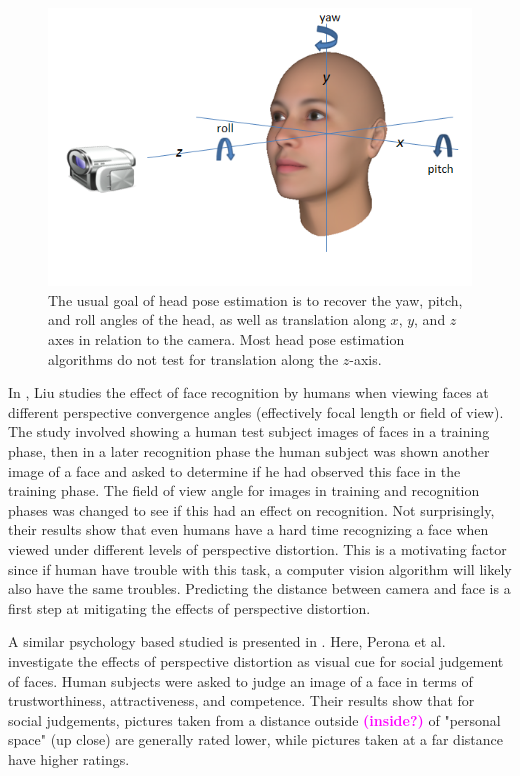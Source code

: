 \documentclass[runningheads]{llncs}
\newcommand {\ericnote} [1] {{\bf \textcolor{magenta}{(#1)}}}
\begin{document}
\begin{figure}[ht]
\centering
\includegraphics[width=.7\linewidth]{resources/figures/head_pose.png}
\caption{The usual goal of head pose estimation is to recover the yaw, pitch, and roll angles of the head, as well as translation along $x$, $y$, and $z$ axes in relation to the camera. 
Most head pose estimation algorithms do not test for translation along the $z$-axis.}
\label{fig:head_pose}
\end{figure}

In \cite{liu2003face,liu2006face}, Liu studies the effect of face recognition by humans when viewing faces at different perspective convergence angles (effectively focal length or field of view). 
The study involved showing a human test subject images of faces in a training phase, then in a later recognition phase the human subject was shown another image of a face and asked to determine if he had observed this face in the training phase. 
The field of view angle for images in training and recognition phases was changed to see if this had an effect on recognition. 
Not surprisingly, their results show that even humans have a hard time recognizing a face when viewed under different levels of perspective distortion.  
This is a motivating factor since if human have trouble with this task, a computer vision algorithm will likely also have the same troubles.  
Predicting the distance between camera and face is a first step at mitigating the effects of perspective distortion.

A similar psychology based studied is presented in \cite{perona2007new,bryan2012perspective}. 
Here, Perona et al. investigate the effects of perspective distortion as visual cue for social judgement of faces.  
Human subjects were asked to judge an image of a face in terms of trustworthiness, attractiveness, and competence.  
Their results show that for social judgements, pictures taken from a distance outside \ericnote{inside?} of "personal space" (up close) are generally rated lower, while pictures taken at a far distance have higher ratings.
\end{document}
